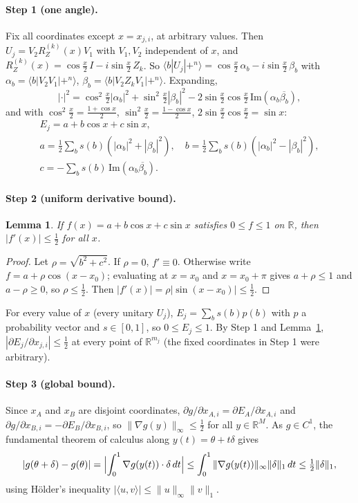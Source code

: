 \documentclass[11pt,a4paper]{article}
\newtheorem{lemma}[theorem]{Lemma}
\theoremstyle{definition}
\theoremstyle{remark}
\newcommand{\R}{\mathbb{R}}
\newcommand{\RZ}{R_Z}
\newcommand{\ip}[2]{\langle #1,#2\rangle}
\begin{document}
\paragraph{Step 1 (one angle).} Fix all coordinates except $x=x_{j,i}$, at arbitrary
values. Then $U_j=V_2\RZ^{(k)}(x)V_1$ with $V_1,V_2$ independent of $x$, and
$\RZ^{(k)}(x)=\cos\tfrac x2\,I-i\sin\tfrac x2\,Z_k$. So
$\langle b|U_j|{+}^n\rangle=\cos\tfrac x2\,\alpha_b-i\sin\tfrac x2\,\beta_b$ with
$\alpha_b=\langle b|V_2V_1|{+}^n\rangle$, $\beta_b=\langle b|V_2Z_kV_1|{+}^n\rangle$.
Expanding,
\[
|\cdot|^2=\cos^2\tfrac x2|\alpha_b|^2+\sin^2\tfrac x2|\beta_b|^2
-2\sin\tfrac x2\cos\tfrac x2\,\mathrm{Im}(\alpha_b\overline{\beta_b}),
\]
and with $\cos^2\tfrac x2=\tfrac{1+\cos x}2$, $\sin^2\tfrac x2=\tfrac{1-\cos x}2$,
$2\sin\tfrac x2\cos\tfrac x2=\sin x$:
\begin{gather*}
E_j=a+b\cos x+c\sin x,\\
a=\tfrac12\sum_bs(b)(|\alpha_b|^2+|\beta_b|^2),\quad
b=\tfrac12\sum_bs(b)(|\alpha_b|^2-|\beta_b|^2),\\
c=-\sum_bs(b)\,\mathrm{Im}(\alpha_b\overline{\beta_b}).
\end{gather*}

\paragraph{Step 2 (uniform derivative bound).}
\begin{lemma}\label{lem:trig}
If $f(x)=a+b\cos x+c\sin x$ satisfies $0\le f\le1$ on $\R$, then $|f'(x)|\le\tfrac12$
for all $x$.
\end{lemma}
\begin{proof}
Let $\rho=\sqrt{b^2+c^2}$. If $\rho=0$, $f'\equiv0$. Otherwise write
$f=a+\rho\cos(x-x_0)$; evaluating at $x=x_0$ and $x=x_0+\pi$ gives $a+\rho\le1$ and
$a-\rho\ge0$, so $\rho\le\tfrac12$. Then $|f'(x)|=\rho|\sin(x-x_0)|\le\tfrac12$.
\end{proof}
For every value of $x$ (every unitary $U_j$), $E_j=\sum_bs(b)p(b)$ with $p$ a
probability vector and $s\in[0,1]$, so $0\le E_j\le1$. By Step 1 and
Lemma~\ref{lem:trig}, $|\partial E_j/\partial x_{j,i}|\le\tfrac12$ at every point of
$\R^{m_j}$ (the fixed coordinates in Step 1 were arbitrary).

\paragraph{Step 3 (global bound).} Since $x_A$ and $x_B$ are disjoint coordinates,
$\partial g/\partial x_{A,i}=\partial E_A/\partial x_{A,i}$ and
$\partial g/\partial x_{B,i}=-\partial E_B/\partial x_{B,i}$, so
$\|\nabla g(y)\|_\infty\le\tfrac12$ for all $y\in\R^M$. As $g\in C^1$, the fundamental
theorem of calculus along $y(t)=\theta+t\delta$ gives
\[
|g(\theta+\delta)-g(\theta)|=\Bigl|\int_0^1\nabla g(y(t))\cdot\delta\,dt\Bigr|
\le\int_0^1\|\nabla g(y(t))\|_\infty\|\delta\|_1\,dt\le\tfrac12\|\delta\|_1,
\]
using Hölder's inequality $|\ip{u}{v}|\le\|u\|_\infty\|v\|_1$.
\end{document}
